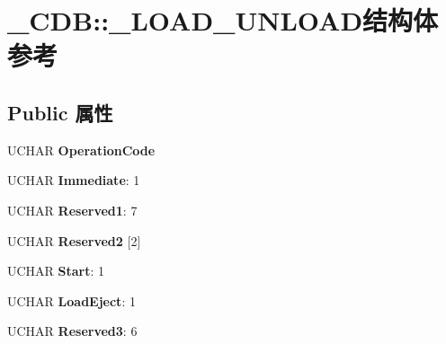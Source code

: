 \hypertarget{struct___c_d_b_1_1___l_o_a_d___u_n_l_o_a_d}{}\section{\+\_\+\+C\+DB\+:\+:\+\_\+\+L\+O\+A\+D\+\_\+\+U\+N\+L\+O\+A\+D结构体 参考}
\label{struct___c_d_b_1_1___l_o_a_d___u_n_l_o_a_d}
\subsection*{Public 属性}
\begin{DoxyCompactItemize}
\item 
\mbox{\label{struct___c_d_b_1_1___l_o_a_d___u_n_l_o_a_d_a60ffdf7c5c0c721e872b20c9ed7b3a57}} 
U\+C\+H\+AR {\bfseries Operation\+Code}
\item 
\mbox{\label{struct___c_d_b_1_1___l_o_a_d___u_n_l_o_a_d_a2998d200c48db2620812d96cf7233edd}} 
U\+C\+H\+AR {\bfseries Immediate}\+: 1
\item 
\mbox{\label{struct___c_d_b_1_1___l_o_a_d___u_n_l_o_a_d_a7b2e303d07cee69a59feb9d1b15d4671}} 
U\+C\+H\+AR {\bfseries Reserved1}\+: 7
\item 
\mbox{\label{struct___c_d_b_1_1___l_o_a_d___u_n_l_o_a_d_a83cc0931ef3a1fcab4f3309ac413e4f1}} 
U\+C\+H\+AR {\bfseries Reserved2} \mbox{[}2\mbox{]}
\item 
\mbox{\label{struct___c_d_b_1_1___l_o_a_d___u_n_l_o_a_d_aee36e7b5beba0cfe94321561817934b5}} 
U\+C\+H\+AR {\bfseries Start}\+: 1
\item 
\mbox{\label{struct___c_d_b_1_1___l_o_a_d___u_n_l_o_a_d_a512b61ed7c3c7ca29d3104a4eb66f700}} 
U\+C\+H\+AR {\bfseries Load\+Eject}\+: 1
\item 
\mbox{\label{struct___c_d_b_1_1___l_o_a_d___u_n_l_o_a_d_a9c4c0dca808b0747b3b9e5a80009d889}} 
U\+C\+H\+AR {\bfseries Reserved3}\+: 6

\end{DoxyCompactItemize}
